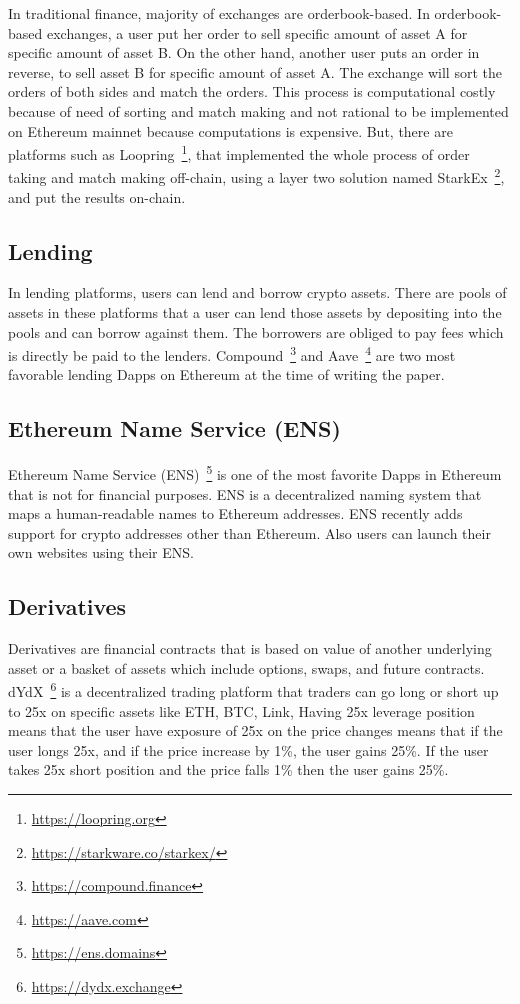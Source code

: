 In traditional finance, majority of exchanges are orderbook-based. In orderbook-based exchanges, a user put her order to sell specific amount of asset A for specific amount of asset B. On the other hand, another user puts an order in reverse, to sell asset B for specific amount of asset A. The exchange will sort the orders of both sides and match the orders. This process is computational costly because of need of sorting and match making and not rational to be implemented on Ethereum mainnet because computations is expensive. But, there are platforms such as Loopring~\footnote{\url{https://loopring.org}}, that implemented the whole process of order taking and match making off-chain, using a layer two solution named StarkEx~\footnote{\url{https://starkware.co/starkex/}}, and put the results on-chain.

\subsection{Lending}
In lending platforms, users can lend and borrow crypto assets. There are pools of assets in these platforms that a user can lend those assets by depositing into the pools and can borrow against them. The borrowers are obliged to pay fees which is directly be paid to the lenders. Compound~\footnote{\url{https://compound.finance}} and Aave~\footnote{\url{https://aave.com}} are two most favorable lending Dapps on Ethereum at the time of writing the paper. 

\subsection{Ethereum Name Service (ENS)}
Ethereum Name Service (ENS)~\footnote{\url{https://ens.domains}} is one of the most favorite Dapps in Ethereum that is not for financial purposes. ENS is a decentralized naming system that maps a human-readable names to Ethereum addresses. 
ENS recently adds support for crypto addresses other than Ethereum. Also users can launch their own websites using their ENS.

\subsection{Derivatives}
Derivatives are financial contracts that is based on value of another underlying asset or a basket of assets which include options, swaps, and future contracts. dYdX~\footnote{\url{https://dydx.exchange}} is a decentralized trading platform that traders can go long or short up to 25x on specific assets like ETH, BTC, Link, \etc
Having 25x leverage position means that the user have exposure of 25x on the price changes means that if the user longs 25x, and if the price increase by 1\%, the user gains 25\%. If the user takes 25x short position and the price falls 1\% then the user gains 25\%.

